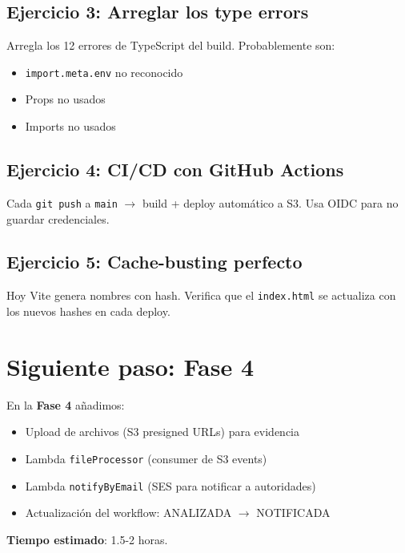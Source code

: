 \documentclass[11pt,a4paper,oneside]{article}
\begin{document}
\subsection{Ejercicio 3: Arreglar los type errors}

Arregla los 12 errores de TypeScript del build. Probablemente son:
\begin{itemize}
  \item \texttt{import.meta.env} no reconocido
  \item Props no usados
  \item Imports no usados
\end{itemize}

\subsection{Ejercicio 4: CI/CD con GitHub Actions}

Cada \texttt{git push} a \texttt{main} $\rightarrow$ build + deploy autom\'atico a S3. Usa OIDC para no guardar credenciales.

\subsection{Ejercicio 5: Cache-busting perfecto}

Hoy Vite genera nombres con hash. Verifica que el \texttt{index.html} se actualiza con los nuevos hashes en cada deploy.

\section{Siguiente paso: Fase 4}

En la \textbf{Fase 4} a\~nadimos:

\begin{itemize}
  \item Upload de archivos (S3 presigned URLs) para evidencia
  \item Lambda \texttt{fileProcessor} (consumer de S3 events)
  \item Lambda \texttt{notifyByEmail} (SES para notificar a autoridades)
  \item Actualizaci\'on del workflow: ANALIZADA $\rightarrow$ NOTIFICADA
\end{itemize}

\textbf{Tiempo estimado}: 1.5-2 horas.
\end{document}
